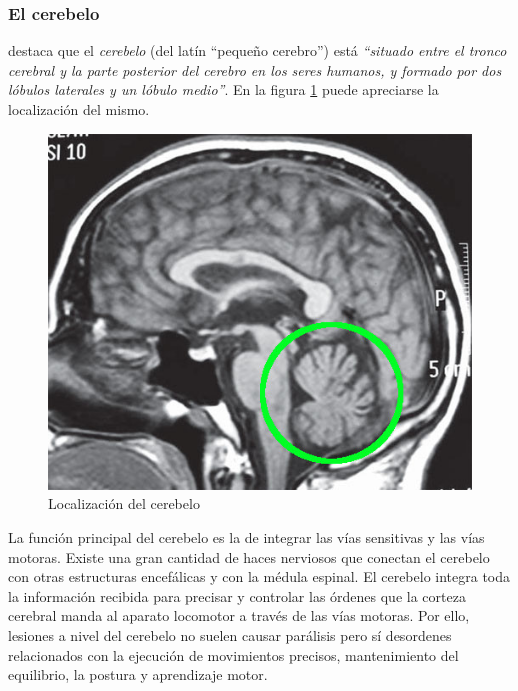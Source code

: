 \subsubsection{El cerebelo}

\cite{Lindberg.} destaca que el {\it cerebelo}  (del latín ``pequeño cerebro'') está {\it ``situado entre el tronco cerebral y la parte posterior del cerebro en los seres humanos, y formado por dos lóbulos laterales y un lóbulo medio''}. En la figura \ref{fig:cerebelo} puede apreciarse la localización del mismo. 


\begin{figure}[h]
  \begin{center}
    \includegraphics[scale=0.4]{images/cerebelo.jpg}
    \caption{Localización del cerebelo}
    \label{fig:cerebelo}
  \end{center}
\end{figure}

La función principal del cerebelo es la de integrar las vías sensitivas y las vías motoras. Existe una gran cantidad de haces nerviosos que conectan el cerebelo con otras estructuras encefálicas y con la médula espinal. El cerebelo integra toda la información recibida para precisar y controlar las órdenes que la corteza cerebral manda al aparato locomotor a través de las vías motoras. Por ello, lesiones a nivel del cerebelo no suelen causar parálisis pero sí desordenes relacionados con la ejecución de movimientos precisos, mantenimiento del equilibrio, la postura y aprendizaje motor.

